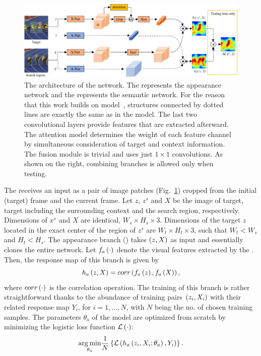 \begin{figure}[t]
    \centerline{\includegraphics[width=\linewidth]{figures/theoretical_foundations/twofold_siamese_net_architecture.pdf}}
    \caption[ architecture]{The architecture of the  network. The  represents the appearance network and the  represents the semantic network. For the reason that this work builds on  model~\cite{Bertinetto2016}, structures connected by dotted lines are exactly the same as in the  model. The last two convolutional layers provide features that are extracted afterward. The attention model determines the weight of each feature channel by simultaneous consideration of target and context information. The fusion module is trivial and uses just $1 \times 1$ convolutions. As shown on the right, combining branches is allowed only when testing. }
    \label{fig:TwofoldSiameseNetArchitecture}
\end{figure}

The  receives an input as a pair of image patches (Fig.~\ref{fig:TwofoldSiameseNetArchitecture}) cropped from the initial (target) frame and the current frame. Let $z$, $z^s$ and $X$ be the image of target, target including the surrounding context and the search region, respectively. Dimensions of $x^s$ and $X$ are identical, $W_s \times H_s \times 3$. Dimensions of the target $z$ located in the exact center of the region of $z^s$ are $W_t \times H_t \times 3$, such that $W_t < W_s$ and $H_t < H_s$. The appearance branch () takes $\left( {z, X} \right)$ as input and essentially clones the entire  network. Let ${f_a} \left( \cdot \right)$ denote the visual features extracted by the . Then, the response map of this branch is given by
\begin{equation}
    {h_a} \left( z, X \right) = {corr} \left( {f_a} \left( z \right), {f_a} \left( X \right) \right),
\end{equation}
where ${corr} \left( \cdot \right)$ is the correlation operation. The training of this branch is rather straightforward thanks to the abundance of training pairs $\left( {z_i, X_i} \right)$ with their related response map $Y_i$, for $i = 1, \dots, N$, with $N$ being the no. of chosen training samples. The parameters $\theta_a$ of the  model are optimized from scratch by minimizing the logistic loss function ${\mathcal{L}} \left( \cdot \right)$:
\begin{equation}
    \label{eq:ANetModelTraining}
    \underset{\theta_a}{\operatorname*{arg\,min}}
    \frac{1}{N}
    \left\{ {
        {\mathcal{L}} \left( 
            {h_a} \left( z_i, X_i; \theta_a \right),
            Y_i
         \right)
    } \right\}.
\end{equation}

